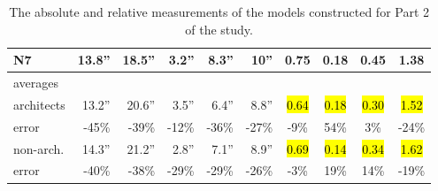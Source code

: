 \begin{table}[b]
\begin{center}
\begin{footnotesize}
\begin{tabular}{@{}l@{~~}|@{~~}r@{~~~}r@{~~~}r@{~~~}r@{~~~}r@{~~}|@{~~}c@{~~~}c@{~~~}c@{~~~}c@{}}
N7      &  13.8''  &  18.5''  &  3.2''  &  8.3''  &   10''  &  0.75    &  0.18    &  0.45  &  1.38 \\ \hline  
{\tiny averages } &          &          &         &         &         &          &          &        &\\
{\tiny architects } & 13.2'' & 20.6'' & 3.5''  &  6.4''  &   8.8'' &  \hl{0.64}    &  \hl{0.18}	  &  \hl{0.30}  &  \hl{1.52} \\
{\tiny error  } &     -45\% & -39\% & -12\% & -36\% & -27\% & -9\% & 54\% & 3\% & -24\% \\
{\tiny non-arch. }    & 14.3'' &	21.2'' & 2.8''	&  7.1''  &   8.9'' &  \hl{0.69}    &  \hl{0.14}	  &  \hl{0.34}  &  \hl{1.62} \\
{\tiny error  } &     -40\% & -38\% & -29\% & -29\% & -26\% & -3\% & 19\% & 14\% & -19\%
\end{tabular}
\end{footnotesize}
\end{center}
\vspace{-0.1in}
\caption{
\label{table:measurements}
The absolute and relative measurements of the
models constructed for Part 2 of the study.
}
\end{table}
